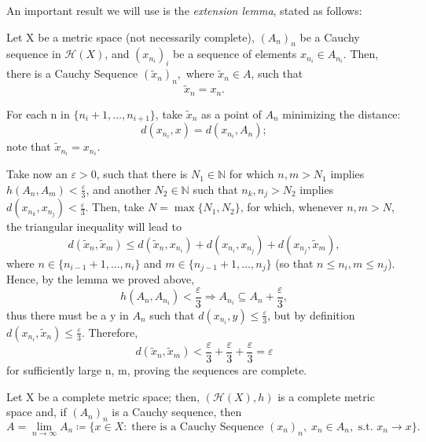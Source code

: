 \documentclass[../fractals_everywhere.tex]{subfiles}
\begin{document}
An important result we will use is the \textit{extension lemma}, stated as follows:
\hypertarget{extension_lemma}{
	\begin{theorem*}
		Let X be a metric space (not necessarily complete), \((A_{n})_{n}\) be a Cauchy sequence in \(\mathcal{H}(X)\), and \((x_{n_{i}})_{i}\) be a sequence of elements \(x_{n_{i}}\in A_{n_{i}}\). Then, there is a Cauchy Sequence \((\tilde{x}_{n})_{n},\) where \(\tilde{x}_{n}\in A\), such that
		\[
			\tilde{x}_{n} = x_{n}.
		\]
	\end{theorem*}
}
\begin{proof*}
	For each n in \(\{n_{i}+1, \dotsc , n_{i+1}\}\), take \(\tilde{x}_{n}\) as a point of \(A_{n}\) minimizing the distance:
	\[
		d(x_{n_{i}}, x) = d(x_{n_{i}}, A_{n});
	\]
	note that \(\tilde{x}_{n_{i}} = x_{n_{i}}\).

	Take now an \(\varepsilon > 0\), such that there is \(N_1\in \mathbb{N}\) for which \(n, m > N_{1}\) implies \(\displaystyle h(A_{n}, A_{m}) < \frac{\varepsilon }{3}\), and another \(N_{2}\in \mathbb{N}\) such that \(n_{k}, n_{j} > N_{2}\) implies \linebreak \(\displaystyle d(x_{n_{k}}, x_{n_{j}})<\frac{\varepsilon }{3}\). Then, take \(N = \max\limits_{}\{N_1, N_2\}\), for which, whenever \(n, m > N\), the triangular inequality will lead to
	\[
		d(\tilde{x}_{n}, \tilde{x}_{m}) \leq d(\tilde{x}_{n}, x_{n_{i}}) + d(x_{n_{i}}, x_{n_{j}}) + d(x_{n_{j}}, \tilde{x}_{m}),
	\]
	where \(n\in \{n_{i-1}+1, \dotsc , n_{i}\}\) and \(m\in \{n_{j-1}+1, \dotsc , n_{j}\}\) (so that \(n\leq n_{i}, m\leq n_{j}\)). Hence, by the lemma we proved above,
	\[
		h(A_{n}, A_{n_{i}}) < \frac{\varepsilon }{3} \Rightarrow A_{n_{i}}\subseteq A_{n}+\frac{\varepsilon }{3},
	\]
	thus there must be a y in \(A_{n}\) such that \(\displaystyle d(x_{n_{i}}, y)\leq \frac{\varepsilon }{3}\), but by definition \(\displaystyle d(x_{n_{i}}, \tilde{x}_{n}) \leq \frac{\varepsilon }{3}\). Therefore,
	\[
		d(\tilde{x}_{n}, \tilde{x}_{m}) < \frac{\varepsilon }{3} + \frac{\varepsilon }{3} + \frac{\varepsilon }{3} = \varepsilon
	\]
	for sufficiently large n, m, proving the sequences are complete. \qedsymbol
\end{proof*}
\begin{theorem*}
	Let X be a complete metric space; then, \((\mathcal{H}(X), h)\) is a complete metric space and, if \((A_{n})_{n}\) is a Cauchy sequence, then
	\[
		A = \lim_{n\to \infty}A_{n} \coloneqq \{x\in X:\; \text{there is a Cauchy Sequence }(x_{n})_{n},\; x_{n}\in A_{n}, \text{ s.t. }x_{n}\to x\}.
	\]
\end{theorem*}
\end{document}

